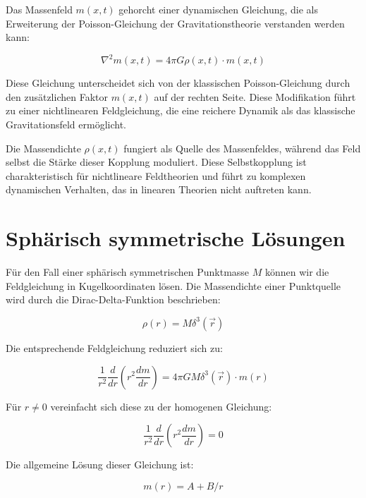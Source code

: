 \documentclass[12pt,a4paper]{report}
\begin{document}
	Das Massenfeld $m(x,t)$ gehorcht einer dynamischen Gleichung, die als Erweiterung der Poisson-Gleichung der Gravitationstheorie verstanden werden kann:
	
	\begin{equation}
		\nabla^2 m(x,t) = 4\pi G \rho(x,t) \cdot m(x,t)
	\end{equation}
	
	Diese Gleichung unterscheidet sich von der klassischen Poisson-Gleichung durch den zusätzlichen Faktor $m(x,t)$ auf der rechten Seite. Diese Modifikation führt zu einer nichtlinearen Feldgleichung, die eine reichere Dynamik als das klassische Gravitationsfeld ermöglicht.
	
	Die Massendichte $\rho(x,t)$ fungiert als Quelle des Massenfeldes, während das Feld selbst die Stärke dieser Kopplung moduliert. Diese Selbstkopplung ist charakteristisch für nichtlineare Feldtheorien und führt zu komplexen dynamischen Verhalten, das in linearen Theorien nicht auftreten kann.
	
	\section{Sphärisch symmetrische Lösungen}
	
	Für den Fall einer sphärisch symmetrischen Punktmasse $M$ können wir die Feldgleichung in Kugelkoordinaten lösen. Die Massendichte einer Punktquelle wird durch die Dirac-Delta-Funktion beschrieben:
	
	\begin{equation}
		\rho(r) = M \delta^3(\vec{r})
	\end{equation}
	
	Die entsprechende Feldgleichung reduziert sich zu:
	
	\begin{equation}
		\frac{1}{r^2} \frac{d}{dr}\left(r^2 \frac{dm}{dr}\right) = 4\pi G M \delta^3(\vec{r}) \cdot m(r)
	\end{equation}
	
	Für $r \neq 0$ vereinfacht sich diese zu der homogenen Gleichung:
	
	\begin{equation}
		\frac{1}{r^2} \frac{d}{dr}\left(r^2 \frac{dm}{dr}\right) = 0
	\end{equation}
	
	Die allgemeine Lösung dieser Gleichung ist:
	
	\begin{equation}
		m(r) = A + B/r
	\end{equation}
	
\end{document}
